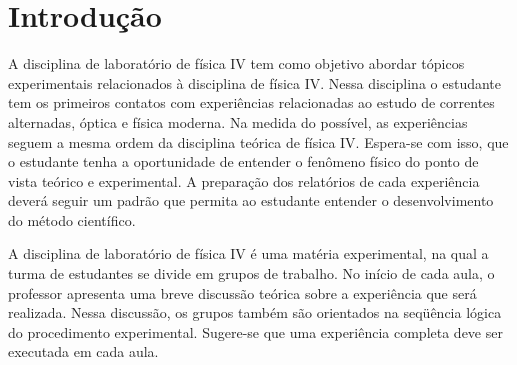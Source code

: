 \chapter*{Introdução}
A disciplina de laboratório de física IV tem como objetivo abordar tópicos experimentais relacionados à
disciplina de física IV. Nessa disciplina o estudante tem os primeiros contatos com experiências relacionadas ao
estudo de correntes alternadas, óptica  e física moderna. Na  medida do possível,  as experiências seguem a
mesma ordem da disciplina teórica de física IV. Espera-se com isso, que o estudante tenha a oportunidade de
entender o fenômeno físico do ponto  de vista teórico e experimental. A preparação  dos relatórios de cada
experiência deverá  seguir um padrão que permita  ao estudante entender o desenvolvimento do  método
científico. 

A disciplina de laboratório de física IV é uma matéria experimental, na qual a turma de estudantes se divide em 
grupos de trabalho. No início  de  cada aula, o  professor apresenta uma breve discussão teórica  sobre a
experiência que será realizada. Nessa discussão, os grupos também são orientados na seqüência lógica do 
procedimento experimental. Sugere-se que uma experiência completa deve ser executada em cada aula.  


